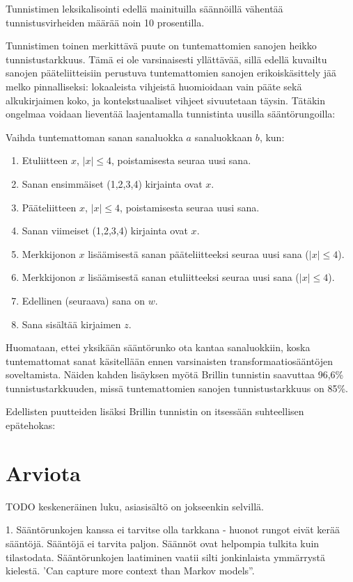 \documentclass[utf8,bachelor,manualbib]{gradu3}
\begin{document}
Tunnistimen leksikalisointi edellä mainituilla säännöillä vähentää tunnistusvirheiden määrää noin 10 prosentilla. \citep{brill1994}

Tunnistimen toinen merkittävä puute on tuntemattomien sanojen heikko tunnistustarkkuus. Tämä ei ole varsinaisesti yllättävää, sillä edellä kuvailtu sanojen pääteliitteisiin perustuva tuntemattomien sanojen erikoiskäsittely jää melko pinnalliseksi: lokaaleista vihjeistä huomioidaan vain pääte sekä alkukirjaimen koko, ja kontekstuaaliset vihjeet sivuutetaan täysin. Tätäkin ongelmaa voidaan lieventää laajentamalla tunnistinta uusilla sääntörungoilla: 

Vaihda tuntemattoman sanan sanaluokka $a$ sanaluokkaan $b$, kun:

\begin{enumerate}
\item Etuliitteen $x$, $|x| \leq 4$, poistamisesta seuraa uusi sana.
\item Sanan ensimmäiset (1,2,3,4) kirjainta ovat $x$. 
\item Pääteliitteen $x$, $|x| \leq 4$, poistamisesta seuraa uusi sana.
\item Sanan viimeiset (1,2,3,4) kirjainta ovat $x$. 
\item Merkkijonon $x$ lisäämisestä sanan pääteliitteeksi seuraa uusi sana ($|x| \leq 4$).
\item Merkkijonon $x$ lisäämisestä sanan etuliitteeksi seuraa uusi sana ($|x| \leq 4$).
\item Edellinen (seuraava) sana on $w$.
\item Sana sisältää kirjaimen $z$.
\end{enumerate}

Huomataan, ettei yksikään sääntörunko ota kantaa sanaluokkiin, koska tuntemattomat sanat käsitellään ennen varsinaisten transformaatiosääntöjen soveltamista. Näiden kahden lisäyksen myötä Brillin tunnistin saavuttaa 96,6\% tunnistustarkkuuden, missä tuntemattomien sanojen tunnistustarkkuus on 85\%. \citep{brill1994, brill1995}

Edellisten puutteiden lisäksi Brillin tunnistin on itsessään suhteellisen epätehokas: 

\section{Arviota}
TODO keskeneräinen luku, asiasisältö on jokseenkin selvillä.

1. Sääntörunkojen kanssa ei tarvitse olla tarkkana - huonot rungot eivät kerää sääntöjä. Sääntöjä ei tarvita paljon. Säännöt ovat helpompia tulkita kuin tilastodata. Sääntörunkojen laatiminen vaatii silti jonkinlaista ymmärrystä kielestä. 'Can capture more context than Markov models''.
\end{document}
